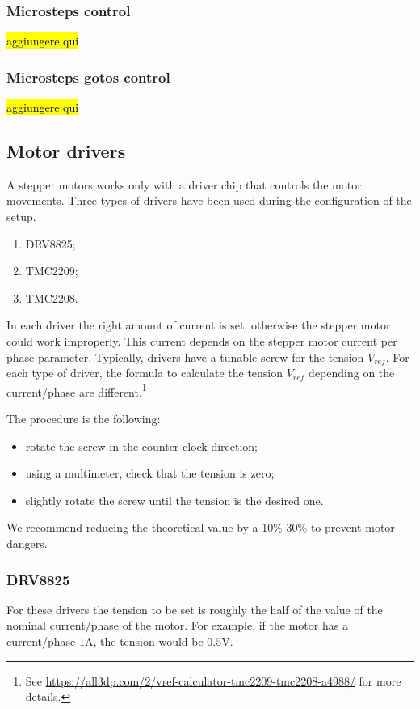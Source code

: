 \subsubsection{Microsteps control}
\hl{aggiungere qui}

\subsubsection{Microsteps gotos control}
\hl{aggiungere qui}

\subsection{Motor drivers}
A stepper motors works only with a driver chip that controls the motor movements.
Three types of drivers have been used during the configuration of the setup.
\begin{enumerate}
    \item DRV8825;
    \item TMC2209;
    \item TMC2208.
\end{enumerate}

In each driver the right amount of current is set, otherwise the stepper motor could work improperly.
This current depends on the stepper motor current per phase parameter.
Typically, drivers have a tunable screw for the tension \(V_{ref}\).
For each type of driver, the formula to calculate the tension \(V_{ref}\) depending on the current/phase are different.\footnote{See \url{https://all3dp.com/2/vref-calculator-tmc2209-tmc2208-a4988/} for more details.}

The procedure is the following:
\begin{itemize}
    \item rotate the screw in the counter clock direction;
    \item using a multimeter, check that the tension is zero;
    \item slightly rotate the screw until the tension is the desired one.
\end{itemize}
We recommend reducing the theoretical value by a 10\%-30\% to prevent motor dangers.

\subsubsection{DRV8825}
For these drivers the tension to be set is roughly the half of the value of the nominal current/phase of the motor.
For example, if the motor has a current/phase \(1\)A, the tension would be \(0.5\)V.

